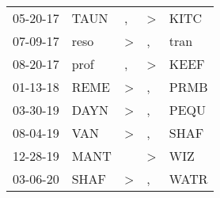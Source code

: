 \begin{supertabular}{p{0.07\textwidth}p{0.06\textwidth}p{0.02\textwidth}p{0.02\textwidth}p{0.06\textwidth}}
          05-20-17\textsuperscript{} &           TAUN\textsuperscript{} &                , &     \textgreater &           KITC\textsuperscript{} \\
          07-09-17\textsuperscript{} &           reso\textsuperscript{} &     \textgreater &                , &           tran\textsuperscript{} \\
          08-20-17\textsuperscript{} &           prof\textsuperscript{} &                , &     \textgreater &           KEEF\textsuperscript{} \\
          01-13-18\textsuperscript{} &           REME\textsuperscript{} &     \textgreater &                , &           PRMB\textsuperscript{} \\
          03-30-19\textsuperscript{} &           DAYN\textsuperscript{} &     \textgreater &                , &           PEQU\textsuperscript{} \\
          08-04-19\textsuperscript{} &            VAN\textsuperscript{} &     \textgreater &                , &           SHAF\textsuperscript{} \\
          12-28-19\textsuperscript{} &           MANT\textsuperscript{} &                  &     \textgreater &            WIZ\textsuperscript{} \\
          03-06-20\textsuperscript{} &           SHAF\textsuperscript{} &     \textgreater &                , &           WATR\textsuperscript{} \\
\end{supertabular}
